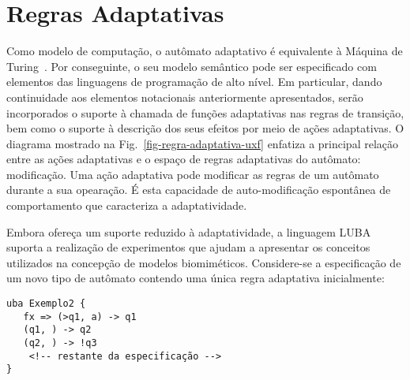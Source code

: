 \section{Regras Adaptativas}
\label{sec:isv:regra-adaptativa}


Como modelo de computação, o autômato adaptativo é equivalente à Máquina de Turing~\cite{neto:1998}. Por conseguinte, o seu modelo semântico pode ser especificado com elementos das linguagens de programação de alto nível. Em particular, dando continuidade aos elementos notacionais anteriormente apresentados, serão incorporados o suporte à chamada de funções adaptativas nas regras de transição, bem como o suporte à descrição dos seus efeitos por meio de ações adaptativas. O diagrama mostrado na Fig.~\ref{fig-regra-adaptativa-uxf} enfatiza a principal relação entre as ações adaptativas e o espaço de regras adaptativas do autômato: modificação. Uma ação adaptativa pode modificar as regras de um autômato durante a sua opearação. É esta capacidade de auto-modificação espontânea de comportamento que caracteriza a adaptatividade.


Embora ofereça um suporte reduzido à adaptatividade, a linguagem LUBA suporta a realização de experimentos que ajudam a apresentar os conceitos utilizados na concepção de modelos biomiméticos. Considere-se a especificação de um novo tipo de autômato contendo uma única regra adaptativa inicialmente:

\begin{lstlisting}
uba Exemplo2 {
   fx => (>q1, a) -> q1
   (q1, ) -> q2
   (q2, ) -> !q3
	<!-- restante da especificação -->
}
\end{lstlisting}

